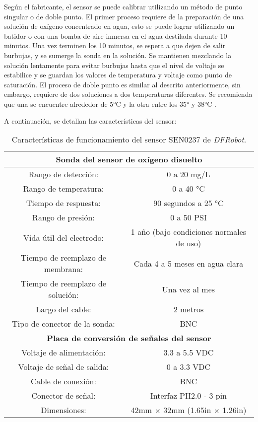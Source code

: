 Según el fabricante, el sensor se puede calibrar utilizando un método de punto singular o de doble punto. El primer proceso requiere de la preparación de una solución de oxígeno concentrado en agua, esto se puede lograr utilizando un batidor o con una bomba de aire inmersa en el agua destilada durante 10 minutos. Una vez terminen los 10 minutos, se espera a que dejen de salir burbujas, y se sumerge la sonda en la solución. Se mantienen mezclando la solución lentamente para evitar burbujas hasta que el nivel de voltaje se estabilice y se guardan los valores de temperatura y voltaje como punto de saturación. El proceso de doble punto es similar al descrito anteriormente, sin embargo, requiere de dos soluciones a dos temperaturas diferentes. Se recomienda que una se encuentre alrededor de 5°C y la otra entre los 35° y 38°C \cite{DFRobot_DOsensor}. 

A continuación, se detallan las características del sensor:

\begin{table}[H]
	\centering
	\begin{tabular}{|c|c|}
	\hline
	\multicolumn{2}{|c|}{\textbf{Sonda del sensor de oxígeno disuelto}}\\ \hline
		Rango de detección: & 0 a 20 mg/L \\ \hline
		Rango de temperatura: & 0 a 40 °C \\ \hline
		Tiempo de respuesta: & 90 segundos a 25 °C \\ \hline
		Rango de presión: & 0 a 50 PSI \\ \hline
		Vida útil del electrodo: & 1 año (bajo condiciones normales de uso) \\ \hline
		Tiempo de reemplazo de membrana: & Cada 4 a 5 meses en agua clara \\ \hline
		Tiempo de reemplazo de solución: & Una vez al mes \\ \hline
		Largo del cable: & 2 metros \\ \hline
		Tipo de conector de la sonda: & BNC \\ \hline
		\multicolumn{2}{|c|}{\textbf{Placa de conversión de señales del sensor}}\\ \hline 
		Voltaje de alimentación: & 3.3 a 5.5 VDC \\ \hline
		Voltaje de señal de salida: & 0 a 3.3 VDC \\ \hline
		Cable de conexión: & BNC \\ \hline
		Conector de señal: & Interfaz PH2.0 - 3 pin \\ \hline
		Dimensiones: & 42mm $\times$ 32mm (1.65in $\times$ 1.26in) \\ \hline
	\end{tabular}
	\caption{Características de funcionamiento del sensor SEN0237 de \textit{DFRobot}.}
	\label{Cuadro1}
\end{table}

